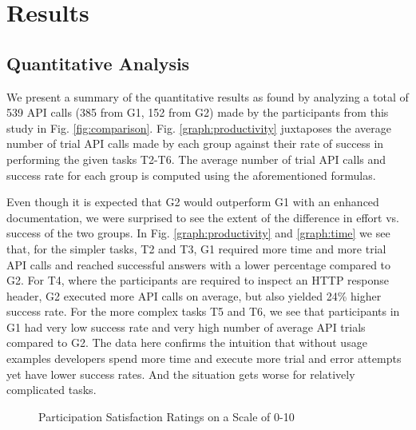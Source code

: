 \documentclass[conference]{IEEEtran}
\begin{document}
\section{Results}
\label{sec:results}


\subsection{Quantitative Analysis} %


We present a summary of the quantitative results as found by analyzing a total of 539 API calls (385 from G1, 152 from G2) made by the participants from this study in Fig. \ref{fig:comparison}. Fig. \ref{graph:productivity} juxtaposes the average number of trial API calls made by each group against their rate of success in performing the given tasks T2-T6. The average number of trial API calls and success rate for each group is computed using the aforementioned formulas.

Even though it is expected that G2 would outperform G1 with an enhanced documentation, we were surprised to see the extent of the difference in effort vs. success of the two groups. In Fig. \ref{graph:productivity} and \ref{graph:time} we see that, for the simpler tasks, T2 and T3, G1 required more time and more trial API calls and reached successful answers with a lower percentage compared to G2. For T4, where the participants are required to inspect an HTTP response header, G2 executed more API calls on average, but also yielded 24\% higher success rate. For the more complex tasks T5 and T6, we see that participants in G1 had very low success rate and very high number of average API trials compared to G2. The data here confirms the intuition that without usage examples developers spend more time and execute more trial and error attempts yet have lower success rates. And the situation gets worse for relatively complicated tasks.

\begin{figure}[h]
\centering

\caption{Participation Satisfaction Ratings on a Scale of 0-10}
\label{fig:rating}

\end{figure}
\end{document}
